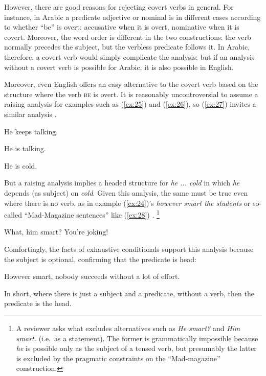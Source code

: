\documentclass[output=paper
	        ,collection
	        ,collectionchapter
 	        ,biblatex
                ,babelshorthands
                ,newtxmath
                ,draftmode
                ,colorlinks, citecolor=brown
]{langscibook}
\begin{document}
However, there are good reasons for rejecting covert verbs in general. For instance, in Arabic a predicate adjective or nominal is in different cases according to whether ``be'' is overt: accusative when it is overt, nominative when it is covert. Moreover, the word order is different in the two constructions: the verb normally precedes the subject, but the verbless predicate follows it. In Arabic, therefore, a covert verb would simply complicate the analysis; but if an analysis without a covert verb is possible for Arabic, it is also possible in English.

Moreover, even English offers an easy alternative to the covert verb based on the structure where the verb \textsc{be} is overt. It is reasonably uncontroversial to assume a raising analysis for examples such as (\ref{ex:25}) and (\ref{ex:26}), so (\ref{ex:27}) invites a similar analysis \citep{MuellerCopula}.

\eal
\ex \label{ex:25} He keeps talking.

\ex \label{ex:26} He is talking.

\ex \label{ex:27} He is cold.
\zl

But a raising analysis implies a headed structure for \emph{he ... cold} in which \emph{he} depends (as subject) on \emph{cold}. Given this analysis, the same must be true even where there is no verb, as in example (\ref{ex:24})'s \emph{however smart the students} or so-called ``Mad-Magazine sentences'' like (\ref{ex:28}) \citep{Lambrecht:90}.%
%
\footnote{A reviewer asks what excludes alternatives such as \emph{He smart?} and \emph{Him smart.} (i.e.\ as a statement). The former is grammatically impossible because \emph{he} is possible only as the subject of a tensed verb, but presumably the latter is excluded by the pragmatic constraints on the ``Mad-magazine'' construction.}%
%

\begin{exe}
	\ex \label{ex:28} What, him smart? You’re joking!
\end{exe}

Comfortingly, the facts of exhaustive conditionals support this analysis because the subject is optional, confirming that the predicate is head:

\begin{exe}
	\ex \label{ex:29} However smart, nobody succeeds without a lot of effort.
\end{exe}

In short, where there is just a subject and a predicate, without a verb, then the predicate is the head.
\end{document}

